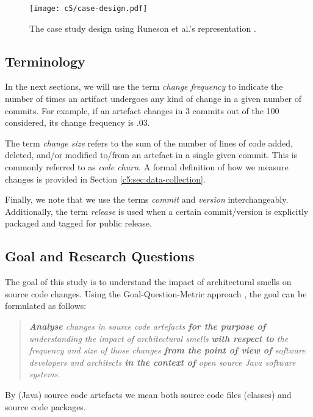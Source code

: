 \begin{figure}
    \centering
    \texttt{[image: c5/case-design.pdf]}
    \caption{The case study design using Runeson et al.'s representation \cite{Runeson2012}.}
    \label{c5:fig:case-design}
\end{figure}

\subsection{Terminology}
In the next sections, we will use the term \emph{change frequency} to indicate the number of times an artifact undergoes any kind of change in a given number of commits.
For example, if an artefact changes in 3 commits out of the 100 considered, its change frequency is $.03$.

The term \emph{change size} refers to the sum of the number of lines of code added, deleted, and/or modified to/from an artefact in a single given commit.
This is commonly referred to as \emph{code churn}.
A formal definition of how we measure changes is provided in Section \ref{c5:sec:data-collection}.

Finally, we note that we use the terms \emph{commit} and \emph{version} interchangeably. Additionally, the term \emph{release} is used when a certain commit/version is explicitly packaged and tagged for public release.

\subsection{Goal and Research Questions}
The goal of this study is to understand the impact of architectural smells on source code changes.
Using the Goal-Question-Metric approach \cite{VanSolingen2002}, the goal can be formulated as follows: 
\begin{quote}
    \itshape
    \textbf{Analyse} changes in source code artefacts \textbf{for the purpose of} understanding the impact of architectural smells \textbf{with respect to} the frequency and size of those changes \textbf{from the point of view of} software developers and architects \textbf{in the context of} open source Java software systems.
\end{quote}
By (Java) source code artefacts we mean both source code files (classes) and source code packages.

